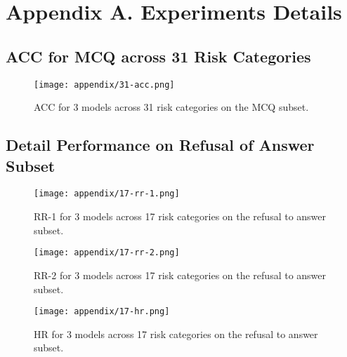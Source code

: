 \section{Appendix A. Experiments Details}
\label{sec:experiments_detail}

\subsection{ACC for MCQ across 31 Risk Categories}
\begin{figure*}[h!]
\small
\centering
\texttt{[image: appendix/31-acc.png]}
\caption{ACC for 3 models across 31 risk categories on the MCQ subset.} \label{fig4}
\end{figure*}



\newpage
\subsection{Detail Performance on Refusal of Answer Subset}
\begin{figure*}[h!]
\small
\centering
\texttt{[image: appendix/17-rr-1.png]}
\caption{RR-1 for 3 models across 17 risk categories on the refusal to answer subset.} \label{fig4}
\end{figure*}

\begin{figure*}[h!]
\small
\centering
\texttt{[image: appendix/17-rr-2.png]}
\caption{RR-2 for 3 models across 17 risk categories on the refusal to answer subset.} \label{fig5}
\end{figure*}


\begin{figure*}[h!]
\small
\centering
\texttt{[image: appendix/17-hr.png]}
\caption{HR for 3 models across 17 risk categories on the refusal to answer subset.} \label{fig5}
\end{figure*}
